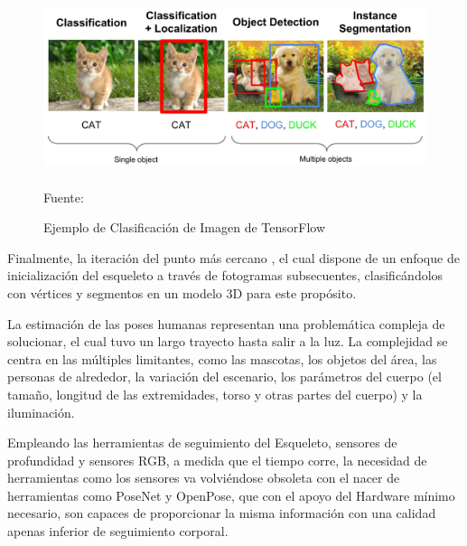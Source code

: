 \begin{figure}[t!]
	\centering
	\includegraphics[width=13cm,height=5cm,]{./Images/ejemplotensorflow.jpg}
	\caption{Ejemplo de Clasificación de Imagen de TensorFlow}
	\footnotesize Fuente: \cite{ejemplotensorflow}
	\label{tensorfl}
\end{figure}

Finalmente, la iteración del punto más cercano \cite{grest2005nonlinear}, el cual dispone de un enfoque de inicialización del esqueleto a través de fotogramas subsecuentes, clasificándolos con vértices y segmentos en un modelo 3D para este propósito.

La estimación de las poses humanas representan una problemática compleja de solucionar, el cual tuvo un largo trayecto hasta salir a la luz. La complejidad se centra en las múltiples limitantes, como las mascotas, los objetos del área, las personas de alrededor, la variación del escenario, los parámetros del cuerpo (el tamaño, longitud de las extremidades, torso y otras partes del cuerpo) y la iluminación.

Empleando las herramientas de seguimiento del Esqueleto, sensores de profundidad y sensores RGB, a medida que el tiempo corre, la necesidad de herramientas como los sensores va volviéndose obsoleta con el nacer de herramientas como PoseNet y OpenPose, que con el apoyo del Hardware mínimo necesario, son capaces de proporcionar la misma información con una calidad apenas inferior de seguimiento corporal.

